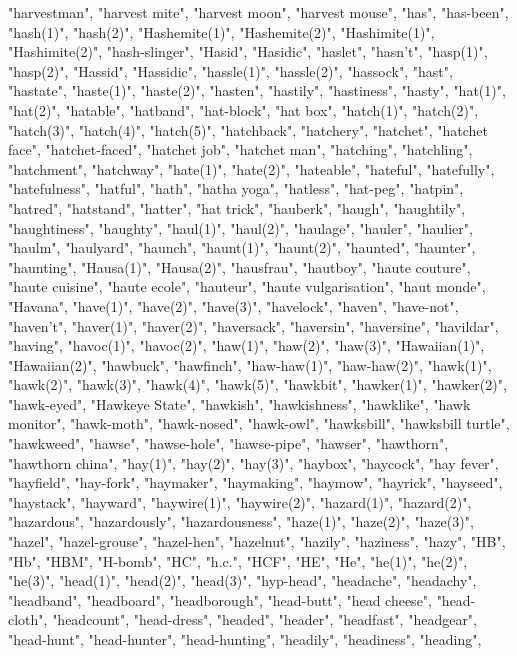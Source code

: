 "harvestman",
"harvest mite",
"harvest moon",
"harvest mouse",
"has",
"has-been",
"hash(1)",
"hash(2)",
"Hashemite(1)",
"Hashemite(2)",
"Hashimite(1)",
"Hashimite(2)",
"hash-slinger",
"Hasid",
"Hasidic",
"haslet",
"hasn't",
"hasp(1)",
"hasp(2)",
"Hassid",
"Hassidic",
"hassle(1)",
"hassle(2)",
"hassock",
"hast",
"hastate",
"haste(1)",
"haste(2)",
"hasten",
"hastily",
"hastiness",
"hasty",
"hat(1)",
"hat(2)",
"hatable",
"hatband",
"hat-block",
"hat box",
"hatch(1)",
"hatch(2)",
"hatch(3)",
"hatch(4)",
"hatch(5)",
"hatchback",
"hatchery",
"hatchet",
"hatchet face",
"hatchet-faced",
"hatchet job",
"hatchet man",
"hatching",
"hatchling",
"hatchment",
"hatchway",
"hate(1)",
"hate(2)",
"hateable",
"hateful",
"hatefully",
"hatefulness",
"hatful",
"hath",
"hatha yoga",
"hatless",
"hat-peg",
"hatpin",
"hatred",
"hatstand",
"hatter",
"hat trick",
"hauberk",
"haugh",
"haughtily",
"haughtiness",
"haughty",
"haul(1)",
"haul(2)",
"haulage",
"hauler",
"haulier",
"haulm",
"haulyard",
"haunch",
"haunt(1)",
"haunt(2)",
"haunted",
"haunter",
"haunting",
"Hausa(1)",
"Hausa(2)",
"hausfrau",
"hautboy",
"haute couture",
"haute cuisine",
"haute ecole",
"hauteur",
"haute vulgarisation",
"haut monde",
"Havana",
"have(1)",
"have(2)",
"have(3)",
"havelock",
"haven",
"have-not",
"haven't",
"haver(1)",
"haver(2)",
"haversack",
"haversin",
"haversine",
"havildar",
"having",
"havoc(1)",
"havoc(2)",
"haw(1)",
"haw(2)",
"haw(3)",
"Hawaiian(1)",
"Hawaiian(2)",
"hawbuck",
"hawfinch",
"haw-haw(1)",
"haw-haw(2)",
"hawk(1)",
"hawk(2)",
"hawk(3)",
"hawk(4)",
"hawk(5)",
"hawkbit",
"hawker(1)",
"hawker(2)",
"hawk-eyed",
"Hawkeye State",
"hawkish",
"hawkishness",
"hawklike",
"hawk monitor",
"hawk-moth",
"hawk-nosed",
"hawk-owl",
"hawksbill",
"hawksbill turtle",
"hawkweed",
"hawse",
"hawse-hole",
"hawse-pipe",
"hawser",
"hawthorn",
"hawthorn china",
"hay(1)",
"hay(2)",
"hay(3)",
"haybox",
"haycock",
"hay fever",
"hayfield",
"hay-fork",
"haymaker",
"haymaking",
"haymow",
"hayrick",
"hayseed",
"haystack",
"hayward",
"haywire(1)",
"haywire(2)",
"hazard(1)",
"hazard(2)",
"hazardous",
"hazardously",
"hazardousness",
"haze(1)",
"haze(2)",
"haze(3)",
"hazel",
"hazel-grouse",
"hazel-hen",
"hazelnut",
"hazily",
"haziness",
"hazy",
"HB",
"Hb",
"HBM",
"H-bomb",
"HC",
"h.c.",
"HCF",
"HE",
"He",
"he(1)",
"he(2)",
"he(3)",
"head(1)",
"head(2)",
"head(3)",
"hyp-head",
"headache",
"headachy",
"headband",
"headboard",
"headborough",
"head-butt",
"head cheese",
"head-cloth",
"headcount",
"head-dress",
"headed",
"header",
"headfast",
"headgear",
"head-hunt",
"head-hunter",
"head-hunting",
"headily",
"headiness",
"heading",

